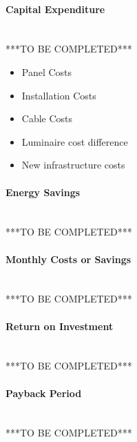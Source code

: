 \paragraph{Capital Expenditure}
~\\
***TO BE COMPLETED***

\begin{itemize}[noitemsep,nolistsep]
	\item Panel Costs
	\item Installation Costs
	\item Cable Costs
	\item Luminaire cost difference
	\item New infrastructure costs
\end{itemize}

\paragraph{Energy Savings}
~\\
***TO BE COMPLETED***

\paragraph{Monthly Costs or Savings}
~\\
***TO BE COMPLETED***

\paragraph{Return on Investment}
~\\
***TO BE COMPLETED***

\paragraph{Payback Period}
~\\
***TO BE COMPLETED***

